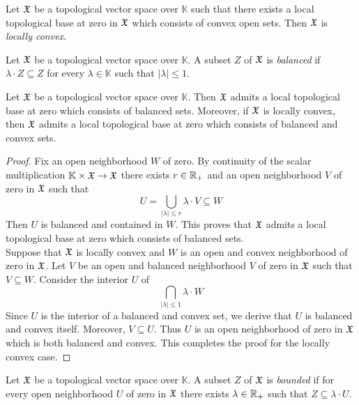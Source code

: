\begin{definition}
Let ${\mathfrak X}$ be a topological vector space over $\mathbb{K}$ such that there exists a local topological base at zero in ${\mathfrak X}$ which consists of convex open sets. Then ${\mathfrak X}$ is \textit{locally convex}. 
\end{definition}

\begin{definition}
Let ${\mathfrak X}$ be a topological vector space over $\mathbb{K}$. A subset $Z$ of ${\mathfrak X}$ is \textit{balanced} if $\lambda \cdot Z \subseteq Z$ for every $\lambda \in \mathbb{K}$ such that $|\lambda| \leq 1$. 
\end{definition}

\begin{proposition}\label{proposition:balanced_local_bases}
Let ${\mathfrak X}$ be a topological vector space over $\mathbb{K}$. Then ${\mathfrak X}$ admits a local topological base at zero which consists of balanced sets. Moreover, if ${\mathfrak X}$ is locally convex, then ${\mathfrak X}$ admits a local topological base at zero which consists of balanced and convex sets.  
\end{proposition}
\begin{proof}
Fix an open neighborhood $W$ of zero. By continuity of the scalar multiplication $\mathbb{K}\times {\mathfrak X} \rightarrow {\mathfrak X}$ there exists $r \in {\mathbb R}_+$ and an open neighborhood $V$ of zero in ${\mathfrak X}$ such that 
$$U = \bigcup_{|\lambda|\leq r}\lambda \cdot V \subseteq W$$
Then $U$ is balanced and contained in $W$. This proves that ${\mathfrak X}$ admits a local topological base at zero which consists of balanced sets.\\
Suppose that ${\mathfrak X}$ is locally convex and $W$ is an open and convex neighborhood of zero in ${\mathfrak X}$. Let $V$ be an  open and balanced neighborhood $V$ of zero in ${\mathfrak X}$ such that $V\subseteq W$. Consider the interior $U$ of
$$\bigcap_{|\lambda|\leq 1}\lambda \cdot W$$
Since $U$ is the interior of a balanced and convex set, we derive that $U$ is balanced and convex itself. Moreover, $V\subseteq U$. Thus $U$ is an open neighborhood of zero in ${\mathfrak X}$ which is both balanced and convex. This completes the proof for the locally convex case. 
\end{proof}

\begin{definition}
Let ${\mathfrak X}$ be a topological vector space over $\mathbb{K}$. A subset $Z$ of ${\mathfrak X}$ is \textit{bounded} if for every open neighborhood $U$ of zero in ${\mathfrak X}$ there exists $\lambda \in {\mathbb R}_+$ such that $Z \subseteq \lambda \cdot U$. 
\end{definition}




